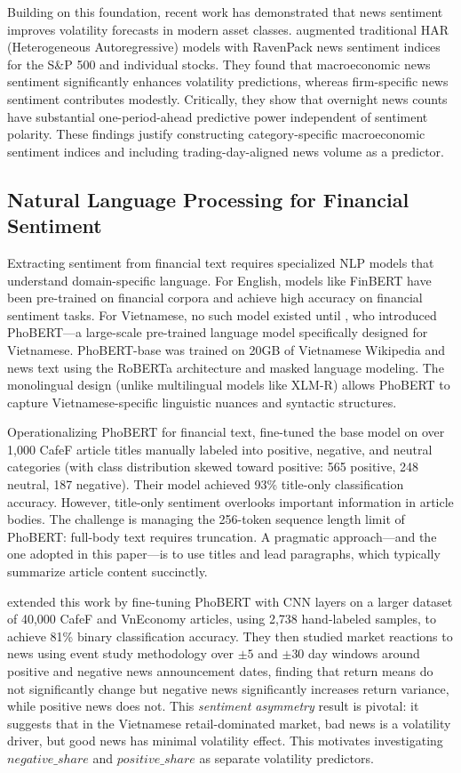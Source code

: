 Building on this foundation, recent work has demonstrated that news sentiment improves volatility forecasts in modern asset classes. \citet{bodilsen2025exploiting} augmented traditional HAR (Heterogeneous Autoregressive) models with RavenPack news sentiment indices for the S\&P 500 and individual stocks. They found that macroeconomic news sentiment significantly enhances volatility predictions, whereas firm-specific news sentiment contributes modestly. Critically, they show that overnight news counts have substantial one-period-ahead predictive power independent of sentiment polarity. These findings justify constructing category-specific macroeconomic sentiment indices and including trading-day-aligned news volume as a predictor.

\subsection{Natural Language Processing for Financial Sentiment}

Extracting sentiment from financial text requires specialized NLP models that understand domain-specific language. For English, models like FinBERT have been pre-trained on financial corpora and achieve high accuracy on financial sentiment tasks. For Vietnamese, no such model existed until \citet{nguyen2020phobert}, who introduced PhoBERT—a large-scale pre-trained language model specifically designed for Vietnamese. PhoBERT-base was trained on 20GB of Vietnamese Wikipedia and news text using the RoBERTa architecture and masked language modeling. The monolingual design (unlike multilingual models like XLM-R) allows PhoBERT to capture Vietnamese-specific linguistic nuances and syntactic structures.

Operationalizing PhoBERT for financial text, \citet{sontung2021stock} fine-tuned the base model on over 1,000 CafeF article titles manually labeled into positive, negative, and neutral categories (with class distribution skewed toward positive: 565 positive, 248 neutral, 187 negative). Their model achieved 93\% title-only classification accuracy. However, title-only sentiment overlooks important information in article bodies. The challenge is managing the 256-token sequence length limit of PhoBERT: full-body text requires truncation. A pragmatic approach—and the one adopted in this paper—is to use titles and lead paragraphs, which typically summarize article content succinctly.

\citet{vu2023sentiments} extended this work by fine-tuning PhoBERT with CNN layers on a larger dataset of 40,000 CafeF and VnEconomy articles, using 2,738 hand-labeled samples, to achieve 81\% binary classification accuracy. They then studied market reactions to news using event study methodology over $\pm5$ and $\pm30$ day windows around positive and negative news announcement dates, finding that return means do not significantly change but negative news significantly increases return variance, while positive news does not. This \textit{sentiment asymmetry} result is pivotal: it suggests that in the Vietnamese retail-dominated market, bad news is a volatility driver, but good news has minimal volatility effect. This motivates investigating $negative\_share$ and $positive\_share$ as separate volatility predictors.

